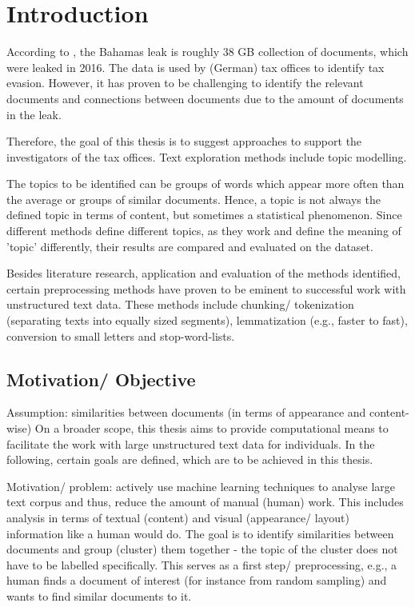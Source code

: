 \chapter{Introduction}\label{ch:introduction}

According to \cite{data-corpus-bahamas-leaks}, the Bahamas leak is roughly 38 GB collection of documents, which were leaked in 2016.
The data is used by (German) tax offices to identify tax evasion.
However, it has proven to be challenging to identify the relevant documents and connections between documents due to the amount of documents in the leak.

Therefore, the goal of this thesis is to suggest approaches to support the investigators of the tax offices.
Text exploration methods include topic modelling.

The topics to be identified can be groups of words which appear more often than the average or groups of similar documents.
Hence, a topic is not always the defined topic in terms of content, but sometimes a statistical phenomenon.
Since different methods define different topics, as they work and define the meaning of 'topic' differently, 
their results are compared and evaluated on the dataset.

Besides literature research, application and evaluation of the methods identified, 
certain preprocessing methods have proven to be eminent to successful work with unstructured text data.
These methods include chunking/ tokenization (separating texts into equally sized segments), lemmatization (e.g., faster to fast), 
conversion to small letters and stop-word-lists.

\section{Motivation/ Objective}\label{sec:motivation}

Assumption: similarities between documents (in terms of appearance and content-wise)
On a broader scope, this thesis aims to provide computational means to facilitate the work with large unstructured text data for individuals.
In the following, certain goals are defined, which are to be achieved in this thesis.

Motivation/ problem: actively use machine learning techniques to analyse large text corpus and thus, reduce the amount of manual (human) work.
This includes analysis in terms of textual (content) and visual (appearance/ layout) information like a human would do.
The goal is to identify similarities between documents and group (cluster) them together - the topic of the cluster does not have to be labelled specifically.
This serves as a first step/ preprocessing, e.g., a human finds a document of interest (for instance from random sampling) and wants to find similar documents to it.


